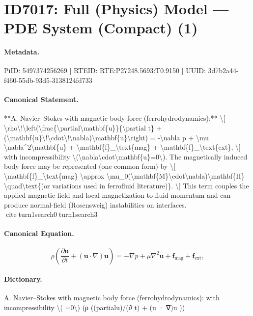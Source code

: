 \section*{ID7017: Full (Physics) Model — PDE System (Compact) (1)}
\paragraph{Metadata.}
PiID: 5497374256269 | RTEID: RTE:P27248.5693:T0.9150 | UUID: 3d7b2a44-f460-55db-93d5-3138124fd733

\paragraph{Canonical Statement.}
**A. Navier–Stokes with magnetic body force (ferrohydrodynamics):** \textbackslash{}[ \textbackslash{}rho\textbackslash{}!\textbackslash{}left(\textbackslash{}frac\{\textbackslash{}partial\textbackslash{}mathbf\{u\}\}\{\textbackslash{}partial t\} + (\textbackslash{}mathbf\{u\}\textbackslash{}!\textbackslash{}cdot\textbackslash{}!\textbackslash{}nabla)\textbackslash{}mathbf\{u\}\textbackslash{}right) = -\textbackslash{}nabla p + \textbackslash{}mu \textbackslash{}nabla\textasciicircum{}2\textbackslash{}mathbf\{u\} + \textbackslash{}mathbf\{f\}\_\textbackslash{}text\{mag\} + \textbackslash{}mathbf\{f\}\_\textbackslash{}text\{ext\}, \textbackslash{}] with incompressibility \textbackslash{}(\textbackslash{}nabla\textbackslash{}cdot\textbackslash{}mathbf\{u\}=0\textbackslash{}). The magnetically induced body force may be represented (one common form) by \textbackslash{}[ \textbackslash{}mathbf\{f\}\_\textbackslash{}text\{mag\} \textbackslash{}approx \textbackslash{}mu\_0(\textbackslash{}mathbf\{M\}\textbackslash{}cdot\textbackslash{}nabla)\textbackslash{}mathbf\{H\} \textbackslash{}quad\textbackslash{}text\{(or variations used in ferrofluid literature)\}. \textbackslash{}] This term couples the applied magnetic field and local magnetization to fluid momentum and can produce normal-field (Rosensweig) instabilities on interfaces. citeturn1search0turn1search3

\paragraph{Canonical Equation.}
\[
\rho\!\left(\frac{\partial\mathbf{u}}{\partial t} + (\mathbf{u}\!\cdot\!\nabla)\mathbf{u}\right) = -\nabla p + \mu \nabla^2\mathbf{u} + \mathbf{f}_\text{mag} + \mathbf{f}_\text{ext},
\]

\paragraph{Dictionary.}
A. Navier–Stokes with magnetic body force (ferrohydrodynamics): with incompressibility \textbackslash{}( =0\textbackslash{}) (ρ ((partialu)/(∂ t) + (u · ∇)u ))


